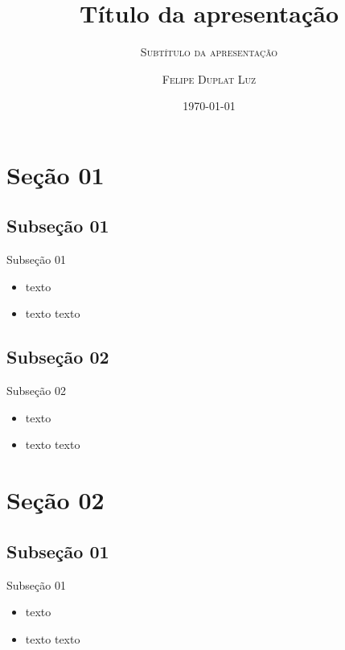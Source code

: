 \documentclass{sintefbeamer}
\title{Título da apresentação}
\subtitle{\textsc{Subtítulo da apresentação}}
\author{\textsc{Felipe Duplat Luz}}
\date{\textsc{\today}}
\begin{document}
\maketitle

\section{Seção 01}

\subsection[]{Subseção 01}

\begin{frame}{Subseção 01}
	\begin{itemize}[<+->]
		\item texto
		
		\item texto texto
	\end{itemize}
\end{frame}


\subsection[]{Subseção 02}

\begin{frame}{Subseção 02}
	\begin{itemize}[<+->]
		\item texto
		
		\item texto texto
	\end{itemize}
\end{frame}



\section{Seção 02}

\subsection[]{Subseção 01}

\begin{frame}{Subseção 01}
	\begin{itemize}[<+->]
		\item texto
		
		\item texto texto
	\end{itemize}
\end{frame}
\end{document}
